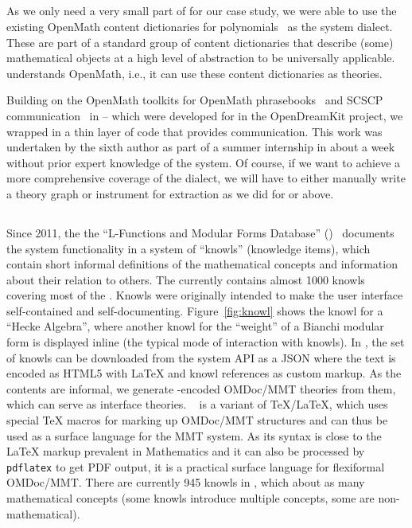 \subsection{\Singular}

As we only need a very small part of \Singular for our case study, we were able to use the existing OpenMath content dictionaries for polynomials~\cite{OMCD:poly:on} as the \Singular system dialect.
These are part of a standard group of content dictionaries that describe (some) mathematical objects at a high level of abstraction to be universally applicable.
\OMMT understands OpenMath, i.e., it can use these content dictionaries as \OMMT theories.

Building on the OpenMath toolkits for OpenMath phrasebooks~\cite{py-openmath:on} and SCSCP communication~\cite{py-scscp:on} in {\Python} -- which were developed for \Sage in the
OpenDreamKit project, we wrapped \Singular in a thin layer of \Python code that provides \SCSCP communication.
This work was undertaken by the sixth author as part of a summer internship in about a week without prior expert knowledge of the system. Of course, if we want to achieve a more comprehensive coverage of the \Singular dialect, we will have to either manually write a theory graph or instrument \Singular for extraction as we did for \Sage or \GAP above. 

\subsection{\LMFDB}

Since 2011, the the ``L-Functions and Modular Forms Database'' (\LMFDB)~\cite{Cremona:LMFDB16,lmfdb:on} documents the system functionality in a system of ``knowls'' (knowledge items), which contain short informal definitions of the mathematical concepts and information about their relation to others.
The \LMFDB currently contains almost 1000 knowls covering most of the \LMFDB.
Knowls were originally intended to make the \LMFDB user interface self-contained and self-documenting.
Figure~\ref{fig:knowl} shows the knowl for a ``Hecke Algebra'', where another knowl for the ``weight'' of a Bianchi modular form is displayed inline (the typical mode of interaction with knowls).
In \LMFDB, the set of knowls can be downloaded from the system API as a JSON where the text is encoded as HTML5 with {\LaTeX} and knowl references as custom markup. As the contents are informal, we generate \sTeX-encoded OMDoc/MMT theories from them, which can serve as interface theories.
\sTeX~\cite{Kohlhase:ulsmf08,sTeX:github:on} is a variant of {\TeX/\LaTeX}, which uses special {\TeX} macros for marking up OMDoc/MMT structures and can thus be used as a surface language for the MMT system.
As its syntax is close to the {\LaTeX} markup prevalent in Mathematics and it can also be processed by \texttt{pdflatex} to get PDF output, it is a practical surface language for flexiformal OMDoc/MMT.
There are currently 945 knowls in \LMFDB, which about as many mathematical concepts (some knowls introduce multiple concepts, some are non-mathematical). 

